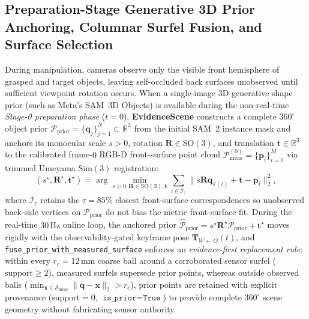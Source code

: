 \documentclass[10pt,journal]{IEEEtran}
\begin{document}
\subsection{Preparation-Stage Generative 3D Prior Anchoring, Columnar Surfel Fusion, and Surface Selection}
\label{sec:surface_selection}
During manipulation, cameras observe only the visible front hemisphere of grasped and target objects, leaving self-occluded back surfaces unobserved until sufficient viewpoint rotation occurs. When a single-image 3D generative shape prior (such as Meta's SAM~3D Objects) is available during the non-real-time \emph{Stage-0 preparation phase} ($t=0$), \textbf{EvidenceScene} constructs a complete $360^\circ$ object prior $\mathcal{P}_{\mathrm{prior}}=\{\mathbf{q}_j\}_{j=1}^N\subset\mathbb{R}^3$ from the initial SAM~2 instance mask and anchors its monocular scale $s>0$, rotation $\mathbf{R}\in\mathrm{SO}(3)$, and translation $\mathbf{t}\in\mathbb{R}^3$ to the calibrated frame-$0$ RGB-D front-surface point cloud $\mathcal{P}_{\mathrm{meas}}^{(0)}=\{\mathbf{p}_i\}_{i=1}^M$ via trimmed Umeyama $\mathrm{Sim}(3)$ registration:
\begin{equation}
    (s^\star,\mathbf{R}^\star,\mathbf{t}^\star)=\arg\min_{s>0,\mathbf{R}\in\mathrm{SO}(3),\mathbf{t}}\sum_{i\in\mathcal{I}_{\tau}}\bigl\|s\mathbf{R}\mathbf{q}_{\pi(i)}+\mathbf{t}-\mathbf{p}_i\bigr\|_2^2,
    \label{eq:sim3_prior_anchor}
\end{equation}
where $\mathcal{I}_{\tau}$ retains the $\tau=85\%$ closest front-surface correspondences so unobserved back-side vertices on $\mathcal{P}_{\mathrm{prior}}$ do not bias the metric front-surface fit. During the real-time $30\,\mathrm{Hz}$ online loop, the anchored prior $\hat{\mathcal{P}}_{\mathrm{prior}}=s^\star\mathbf{R}^\star\mathcal{P}_{\mathrm{prior}}+\mathbf{t}^\star$ moves rigidly with the observability-gated keyframe pose $\mathbf{T}_{W\leftarrow O}(t)$, and \texttt{fuse\_prior\_with\_measured\_surface} enforces an \emph{evidence-first replacement rule}: within every $r_c=12\,\mathrm{mm}$ coarse ball around a corroborated sensor surfel ($\text{support}\ge 2$), measured surfels supersede prior points, whereas outside observed balls ($\min_{\mathbf{x}\in\mathcal{S}_{\mathrm{meas}}}\|\hat{\mathbf{q}}-\mathbf{x}\|_2>r_c$), prior points are retained with explicit provenance ($\text{support}=0$, $\texttt{is\_prior}=\texttt{True}$) to provide complete $360^\circ$ scene geometry without fabricating sensor authority.
\end{document}
